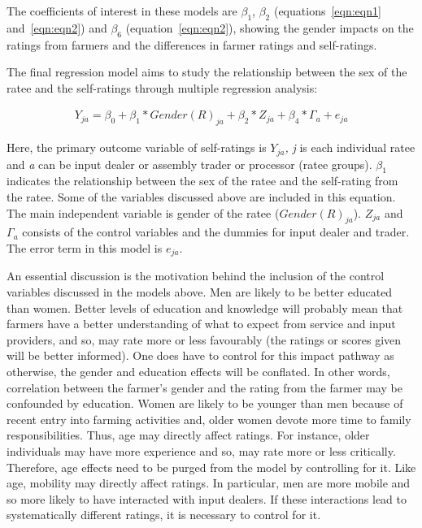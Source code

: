 \documentclass[12pt,english]{article}\usepackage[]{graphicx}\usepackage[]{color}
\begin{document}
The coefficients of interest in these models are\emph{ }$\beta_{1}$,
$\beta_{2}$ (equations~\ref{eqn:eqn1} and~\ref{eqn:eqn2}) and $\beta_{6}$
(equation~\ref{eqn:eqn2}), showing the gender impacts on the ratings
from farmers and the differences in farmer ratings and self-ratings. 

The final regression model aims to study the relationship between
the sex of the ratee and the self-ratings through multiple regression
analysis:

\begin{onehalfspace}
\begin{equation} \label{eqn:eqn3} 
\begin{array}{l}
Y_{ja} = \beta_0 + \beta_1*Gender(R)_{ja} + \beta_2*Z_{ja} + \beta_4*\Gamma_{a} + e_{ja} 
\end{array}
\end{equation}
\end{onehalfspace}

Here, the primary outcome variable of self-ratings is \emph{$Y_{ja}$,}
\emph{j} is each individual ratee and \emph{a} can be input dealer
or assembly trader or processor (ratee groups).\emph{ }$\beta_{1}$
indicates the relationship between the sex of the ratee and the self-rating
from the ratee. Some of the variables discussed above are included
in this equation. The main independent variable is gender of the ratee
(\emph{$Gender(R)_{ja}$}). \emph{$Z_{ja}$ }and \emph{$\Gamma_{a}$}
consists of the control variables and the dummies for input dealer
and trader. The error term in this model is \emph{$e_{ja}$}. 

An essential discussion is the motivation behind the inclusion of
the control variables discussed in the models above. Men are likely
to be better educated than women. Better levels of education and knowledge
will probably mean that farmers have a better understanding of what
to expect from service and input providers, and so, may rate more
or less favourably (the ratings or scores given will be better informed).
One does have to control for this impact pathway as otherwise, the
gender and education effects will be conflated. In other words, correlation
between the farmer's gender and the rating from the farmer may be
confounded by education. Women are likely to be younger than men because
of recent entry into farming activities and, older women devote more
time to family responsibilities. Thus, age may directly affect ratings.
For instance, older individuals may have more experience and so, may
rate more or less critically. Therefore, age effects need to be purged
from the model by controlling for it. Like age, mobility may directly
affect ratings. In particular, men are more mobile and so more likely
to have interacted with input dealers. If these interactions lead
to systematically different ratings, it is necessary to control for
it. 
\end{document}
